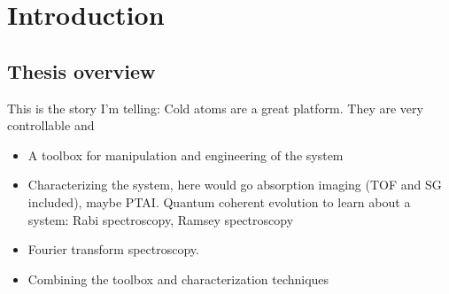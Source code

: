 
\renewcommand{\thechapter}{1}

\chapter{Introduction}

\section{Thesis overview}


This is the story I'm telling: Cold atoms are a great platform. They are very controllable and 

\begin{itemize}
	\item A toolbox for manipulation and engineering of the system
	\item Characterizing the system, here would go absorption imaging (TOF and SG included), maybe PTAI. Quantum coherent evolution to learn about a system: Rabi spectroscopy, Ramsey spectroscopy
	\item Fourier transform spectroscopy.
	\item Combining the toolbox and characterization techniques 
\end{itemize}
